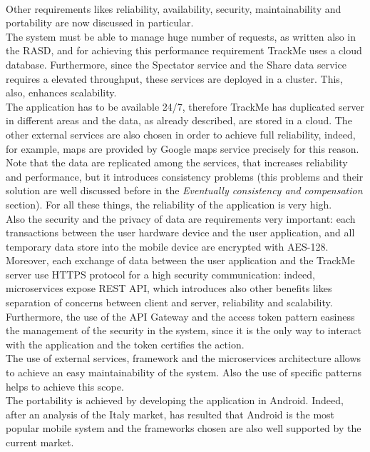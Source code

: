 \\
Other requirements likes reliability, availability, security, maintainability and portability are now discussed in particular. \\
The system must be able to manage huge number of requests, as written also in the RASD, and for achieving this performance requirement TrackMe
uses a cloud database. 
Furthermore, since the Spectator service and the Share data service requires a elevated throughput, these services are deployed in a
cluster.
This, also, enhances scalability.\\ 
The application has to be available 24/7, therefore TrackMe has duplicated server in different areas and the data, as already described, are
stored in a cloud. 
The other external services are also chosen in order to achieve full reliability, indeed, for example, maps are provided by Google maps
service precisely for this reason. 
Note that the data are replicated among the services, that increases reliability and performance, but it introduces consistency problems
(this problems and their solution are well discussed before in the \textit{Eventually consistency and compensation } section).
For all these things, the reliability of the application is very high.\\ 
Also the security and the privacy of data are requirements very
important: each transactions between the user hardware device and the user application, and all temporary data store into the mobile device
are encrypted with AES-128. Moreover, each exchange of data between the user application and the TrackMe server use HTTPS protocol for a high
security communication: indeed, microservices expose REST API, which introduces also other benefits likes separation of concerns between
client and server, reliability and scalability. 
Furthermore, the use of the API Gateway and the access token pattern easiness the management of the security in the system, since it is the
only way to interact with the application and the token certifies the action.\\ 
The use of external services, framework and the microservices architecture allows to achieve an easy maintainability of the system. 
Also the use of specific patterns helps to achieve this scope.\\
The portability is achieved by developing the application in Android. 
Indeed, after an analysis of the Italy market, has resulted that Android is the most popular mobile system and the frameworks chosen are also
well supported by the current market.
